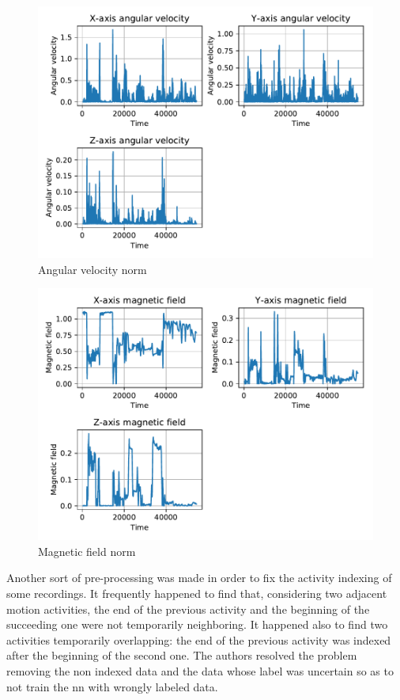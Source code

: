 \begin{figure}[htp]
\includegraphics[scale=0.55]{angular_velocity_susanna.pdf}
\caption{Angular velocity norm}
\label{fig:gyr}
\end{figure}

\begin{figure}[htp]
\includegraphics[scale=0.55]{magnetic_field_susanna.pdf}
\caption{Magnetic field norm}
\label{fig:mag}
\end{figure}


Another sort of pre-processing was made in order to fix the activity indexing of some recordings. It frequently happened to find that, considering two adjacent motion activities, the end of the previous activity and the beginning of the succeeding one were not temporarily neighboring. It happened also to find two activities temporarily overlapping: the end of the previous activity was indexed after the beginning of the second one. 
The authors resolved the problem removing the non indexed data and the data whose label was uncertain so as to not train the \gls{nn} with wrongly labeled data.

